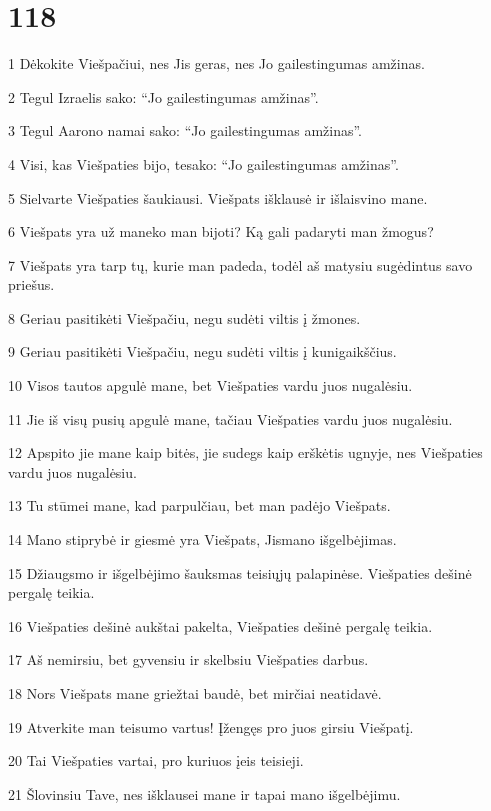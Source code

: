 \chapter{118}


\par 1 Dėkokite Viešpačiui, nes Jis geras, nes Jo gailestingumas amžinas. 
\par 2 Tegul Izraelis sako: “Jo gailestingumas amžinas”. 
\par 3 Tegul Aarono namai sako: “Jo gailestingumas amžinas”. 
\par 4 Visi, kas Viešpaties bijo, tesako: “Jo gailestingumas amžinas”. 
\par 5 Sielvarte Viešpaties šaukiausi. Viešpats išklausė ir išlaisvino mane. 
\par 6 Viešpats yra už mane­ko man bijoti? Ką gali padaryti man žmogus? 
\par 7 Viešpats yra tarp tų, kurie man padeda, todėl aš matysiu sugėdintus savo priešus. 
\par 8 Geriau pasitikėti Viešpačiu, negu sudėti viltis į žmones. 
\par 9 Geriau pasitikėti Viešpačiu, negu sudėti viltis į kunigaikščius. 
\par 10 Visos tautos apgulė mane, bet Viešpaties vardu juos nugalėsiu. 
\par 11 Jie iš visų pusių apgulė mane, tačiau Viešpaties vardu juos nugalėsiu. 
\par 12 Apspito jie mane kaip bitės, jie sudegs kaip erškėtis ugnyje, nes Viešpaties vardu juos nugalėsiu. 
\par 13 Tu stūmei mane, kad parpulčiau, bet man padėjo Viešpats. 
\par 14 Mano stiprybė ir giesmė yra Viešpats, Jis­mano išgelbėjimas. 
\par 15 Džiaugsmo ir išgelbėjimo šauksmas teisiųjų palapinėse. Viešpaties dešinė pergalę teikia. 
\par 16 Viešpaties dešinė aukštai pakelta, Viešpaties dešinė pergalę teikia. 
\par 17 Aš nemirsiu, bet gyvensiu ir skelbsiu Viešpaties darbus. 
\par 18 Nors Viešpats mane griežtai baudė, bet mirčiai neatidavė. 
\par 19 Atverkite man teisumo vartus! Įžengęs pro juos girsiu Viešpatį. 
\par 20 Tai Viešpaties vartai, pro kuriuos įeis teisieji. 
\par 21 Šlovinsiu Tave, nes išklausei mane ir tapai mano išgelbėjimu. 
